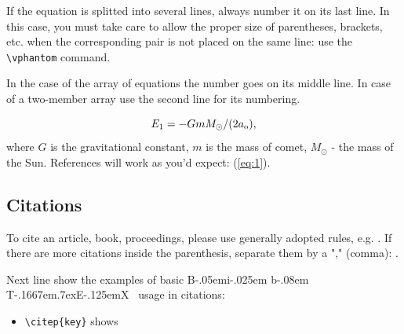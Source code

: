 \documentclass{caosp306}
\def\BibTeX{{\rm B\kern-.05em{\sc i\kern-.025em b}\kern-.08em
             T\kern-.1667em\lower.7ex\hbox{E}\kern-.125emX}}
\begin{document}
If the equation is splitted into several lines, always number it on its
last line. In this case, you must take care to allow the proper size of
parentheses, brackets, etc. when the corresponding pair is not placed on
the same line: use the \verb|\vphantom| command.

In the case of the array of equations the number goes on its middle
line. In case of a two-member array use the second line for its
numbering.

\begin{equation}
 \label{eq:1}
E_{\rm 1}=-GmM_{\odot}/(2a_{\rm o}),
\end{equation}
where $G$ is the gravitational constant, $m$ is the mass of comet,
$M_{\odot}$ - the mass of the Sun. 
References will work as you'd expect: (\ref{eq:1}).



\subsection{Citations}
To cite an article, book, proceedings, please use generally adopted
rules, e.g. \citep{2005ApJ...623..411B}. If there are more citations inside the parenthesis, separate
them by a "," (comma): \citep{2005ApJ...623..411B, 1687pnpm.book.....N}. 

Next line show the examples of basic \BibTeX~ usage in citations:

\begin{itemize}
  \item \verb|\citep{key}| shows \citep{2005ApJ...623..411B}
\end{itemize}
\end{document}
